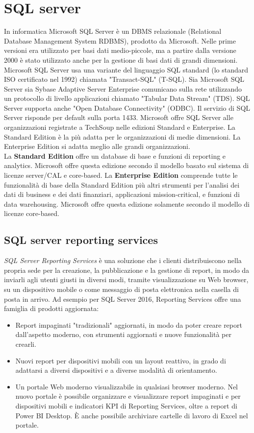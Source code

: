 \documentclass[12pt, a4paper, oneside]{book}
\begin{document}
\section{SQL server}
In informatica Microsoft SQL Server è un DBMS relazionale (Relational Database Management System RDBMS), prodotto da Microsoft. Nelle prime versioni era utilizzato per basi dati medio-piccole, ma a partire dalla versione 2000 è stato utilizzato anche per la gestione di basi dati di grandi dimensioni. Microsoft SQL Server usa una variante del linguaggio SQL standard (lo standard ISO certificato nel 1992) chiamata "Transact-SQL" (T-SQL). Sia Microsoft SQL Server sia Sybase Adaptive Server Enterprise comunicano sulla rete utilizzando un protocollo di livello applicazioni chiamato "Tabular Data Stream" (TDS). SQL Server supporta anche "Open Database Connectivity" (ODBC). Il servizio di SQL Server risponde per default sulla porta 1433.
Microsoft offre SQL Server alle organizzazioni registrate a TechSoup nelle edizioni Standard e Enterprise. La Standard Edition è la più adatta per le organizzazioni di medie dimensioni. La Enterprise Edition si adatta meglio alle grandi organizzazioni.
\\La \textbf{Standard Edition} offre un database di base e funzioni di reporting e analytics. Microsoft offre questa edizione secondo il modello basato sul sistema di licenze server/CAL e core-based.
La \textbf{Enterprise Edition} comprende tutte le funzionalità di base della Standard Edition più altri strumenti per l’analisi dei dati di business e dei dati finanziari, applicazioni mission-critical, e funzioni di data warehousing. Microsoft offre questa  edizione solamente secondo il modello di licenze core-based.
\subsection{SQL server reporting services}
\textit{SQL Server Reporting Services} è una soluzione che i clienti distribuiscono nella propria sede per la creazione, la pubblicazione e la gestione di report, in modo da inviarli agli utenti giusti in diversi modi, tramite visualizzazione su Web browser, su un dispositivo mobile o come messaggio di posta elettronica nella casella di posta in arrivo. Ad esempio per SQL Server 2016, Reporting Services offre una famiglia di prodotti aggiornata:
\begin{itemize}
	\item Report impaginati "tradizionali" aggiornati, in modo da poter creare report dall'aspetto moderno, con strumenti aggiornati e nuove funzionalità per crearli.
	\item Nuovi report per dispositivi mobili con un layout reattivo, in grado di adattarsi a diversi dispositivi e a diverse modalità di orientamento.
	\item Un portale Web moderno visualizzabile in qualsiasi browser moderno. Nel nuovo portale è possibile organizzare e visualizzare report impaginati e per dispositivi mobili e indicatori KPI di Reporting Services, oltre a report di Power BI Desktop. È anche possibile archiviare cartelle di lavoro di Excel nel portale.
\end{itemize}
\end{document}
